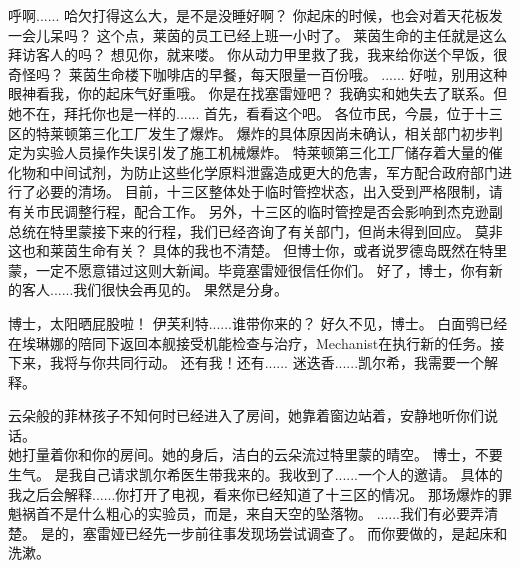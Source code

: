 \documentclass[openany]{book}
\begin{document}
\begin{dialogue}
     呼啊......
     哈欠打得这么大，是不是没睡好啊？
     你起床的时候，也会对着天花板发一会儿呆吗？
     这个点，莱茵的员工已经上班一小时了。
     莱茵生命的主任就是这么拜访客人的吗？
     想见你，就来喽。
     你从动力甲里救了我，我来给你送个早饭，很奇怪吗？
     莱茵生命楼下咖啡店的早餐，每天限量一百份哦。
     ......
     好啦，别用这种眼神看我，你的起床气好重哦。
     你是在找塞雷娅吧？
     我确实和她失去了联系。但她不在，拜托你也是一样的......
     首先，看看这个吧。
     各位市民，今晨，位于十三区的特莱顿第三化工厂发生了爆炸。
     爆炸的具体原因尚未确认，相关部门初步判定为实验人员操作失误引发了施工机械爆炸。
     特莱顿第三化工厂储存着大量的催化物和中间试剂，为防止这些化学原料泄露造成更大的危害，军方配合政府部门进行了必要的清场。
     目前，十三区整体处于临时管控状态，出入受到严格限制，请有关市民调整行程，配合工作。
     另外，十三区的临时管控是否会影响到杰克逊副总统在特里蒙接下来的行程，我们已经咨询了有关部门，但尚未得到回应。
     莫非这也和莱茵生命有关？
     具体的我也不清楚。
     但博士你，或者说罗德岛既然在特里蒙，一定不愿意错过这则大新闻。毕竟塞雷娅很信任你们。
     好了，博士，你有新的客人......我们很快会再见的。
     果然是分身。
\end{dialogue}
\par

\begin{dialogue}
     博士，太阳晒屁股啦！
     伊芙利特......谁带你来的？
     好久不见，博士。
     白面鸮已经在埃琳娜的陪同下返回本舰接受机能检查与治疗，Mechanist在执行新的任务。接下来，我将与你共同行动。
     还有我！还有......
     迷迭香......凯尔希，我需要一个解释。\par
    云朵般的菲林孩子不知何时已经进入了房间，她靠着窗边站着，安静地听你们说话。\\
    她打量着你和你的房间。她的身后，洁白的云朵流过特里蒙的晴空。
     博士，不要生气。
     是我自己请求凯尔希医生带我来的。我收到了......一个人的邀请。
     具体的我之后会解释......你打开了电视，看来你已经知道了十三区的情况。
     那场爆炸的罪魁祸首不是什么粗心的实验员，而是，来自天空的坠落物。
     ......我们有必要弄清楚。
     是的，塞雷娅已经先一步前往事发现场尝试调查了。
     而你要做的，是起床和洗漱。
\end{dialogue}
\par
\end{document}
